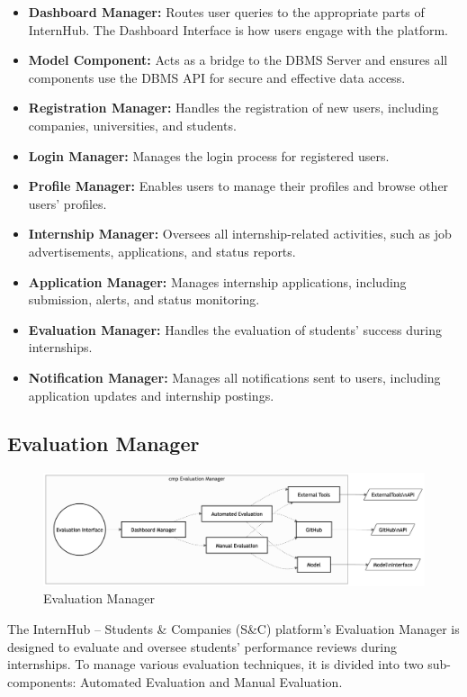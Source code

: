 \begin{itemize}
    \item \textbf{Dashboard Manager:} Routes user queries to the appropriate parts of InternHub. The Dashboard Interface is how users engage with the platform.
    \item \textbf{Model Component:} Acts as a bridge to the DBMS Server and ensures all components use the DBMS API for secure and effective data access.
    \item \textbf{Registration Manager:} Handles the registration of new users, including companies, universities, and students.
    \item \textbf{Login Manager:} Manages the login process for registered users.
    \item \textbf{Profile Manager:} Enables users to manage their profiles and browse other users' profiles.
    \item \textbf{Internship Manager:} Oversees all internship-related activities, such as job advertisements, applications, and status reports.
    \item \textbf{Application Manager:} Manages internship applications, including submission, alerts, and status monitoring.
    \item \textbf{Evaluation Manager:} Handles the evaluation of students' success during internships.
    \item \textbf{Notification Manager:} Manages all notifications sent to users, including application updates and internship postings.
\end{itemize}

\subsection{Evaluation Manager}
\label{subsubsec:evaluation_manager}
\begin{figure}[H]
    \begin{center}
        \includegraphics[width=0.82\linewidth]{JhaBhatiaSharma/imagesDD/EvaluationManager.png}
        \caption{Evaluation Manager}
        \label{fig:evaluationmanager}%
    \end{center}
\end{figure}
The InternHub – Students \& Companies (S\&C) platform's Evaluation Manager is designed to evaluate and oversee students' performance reviews during internships. To manage various evaluation techniques, it is divided into two sub-components: Automated Evaluation and Manual Evaluation.

